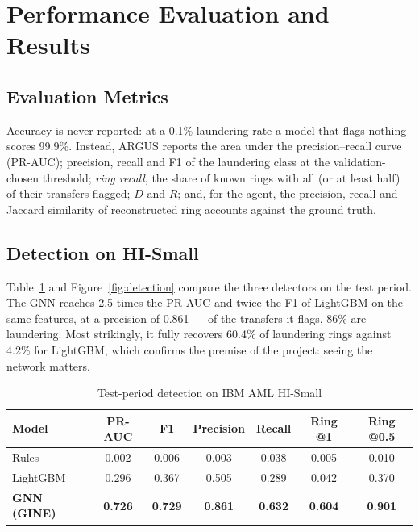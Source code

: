\section{Performance Evaluation and Results}

\subsection{Evaluation Metrics}
Accuracy is never reported: at a 0.1\% laundering rate a model that flags nothing scores 99.9\%. Instead, ARGUS reports the area under the precision--recall curve (PR-AUC); precision, recall and F1 of the laundering class at the validation-chosen threshold; \emph{ring recall}, the share of known rings with all (or at least half) of their transfers flagged; $D$ and $R$; and, for the agent, the precision, recall and Jaccard similarity of reconstructed ring accounts against the ground truth.

\subsection{Detection on HI-Small}
Table~\ref{tab:detection} and Figure~\ref{fig:detection} compare the three detectors on the test period. The GNN reaches 2.5 times the PR-AUC and twice the F1 of LightGBM on the same features, at a precision of 0.861 --- of the transfers it flags, 86\% are laundering. Most strikingly, it fully recovers 60.4\% of laundering rings against 4.2\% for LightGBM, which confirms the premise of the project: seeing the network matters.

\begin{table}[H]
\centering
\renewcommand{\arraystretch}{1.25}
\begin{tabular}{|l|c|c|c|c|c|c|}
\hline
\textbf{Model} & \textbf{PR-AUC} & \textbf{F1} & \textbf{Precision} & \textbf{Recall} & \textbf{Ring @1} & \textbf{Ring @0.5} \\ \hline
Rules & 0.002 & 0.006 & 0.003 & 0.038 & 0.005 & 0.010 \\ \hline
LightGBM & 0.296 & 0.367 & 0.505 & 0.289 & 0.042 & 0.370 \\ \hline
\textbf{GNN (GINE)} & \textbf{0.726} & \textbf{0.729} & \textbf{0.861} & \textbf{0.632} & \textbf{0.604} & \textbf{0.901} \\ \hline
\end{tabular}
\caption{Test-period detection on IBM AML HI-Small}
\label{tab:detection}
\end{table}

